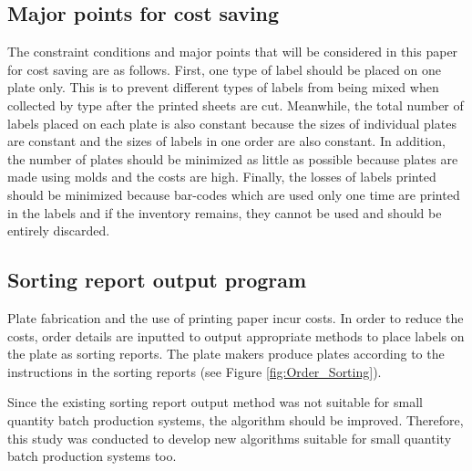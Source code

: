 \subsection{Major points for cost saving}\label{subsec:CostSave}
The constraint conditions and major points that will be considered in this paper for cost saving are as follows. First, one type of label should be placed on one plate only. This is to prevent different types of labels from being mixed when collected by type after the printed sheets are cut. Meanwhile, the total number of labels placed on each plate is also constant because the sizes of individual plates are constant and the sizes of labels in one order are also constant. In addition, the number of plates should be minimized as little as possible because plates are made using molds and the costs are high. Finally, the losses of labels printed should be minimized because bar-codes which are used only one time are printed in the labels and if the inventory remains, they cannot be used and should be entirely discarded.

\subsection{Sorting report output program}\label{subsec:SortProgram}
Plate fabrication and the use of printing paper incur costs. In order to reduce the costs, order details are inputted to output appropriate methods to place labels on the plate as sorting reports. The plate makers produce plates according to the instructions in the sorting reports (see Figure \ref{fig:Order_Sorting}).

Since the existing sorting report output method was not suitable for small quantity batch production systems, the algorithm should be improved. Therefore, this study was conducted to develop new algorithms suitable for small quantity batch production systems too.

